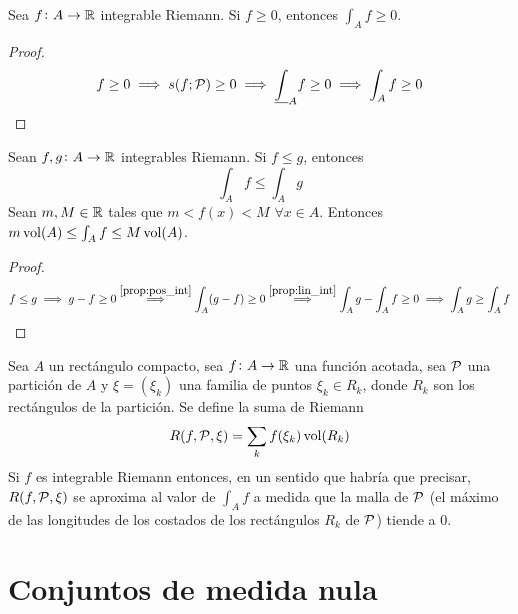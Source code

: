 \begin{prop}[Positividad]\label{prop:pos_int}
    Sea $f \colon A \to \mathbb{R}$ integrable Riemann. Si $f \geq 0$, entonces
    $\int_A f \geq 0$.
\end{prop}
\begin{proof}
    \[
        f \geq 0 \implies s(f;\mathcal{P}) \geq 0 \implies \underline{\int}_A f \geq 0
        \implies \int_A f \geq 0
    \]
\end{proof}

\begin{col}
    Sean $f,g \colon A \to \mathbb{R}$ integrables Riemann. Si $f \leq g$, entonces
    \[
        \int_A f \leq \int_A g
    \]
    Sean $m,M \in \mathbb{R}$ tales que $m < f(x) < M$ $\forall x \in A$. Entonces
    $m\operatorname{vol}(A) \leq \int_A f \leq M\operatorname{vol}(A)$.
\end{col}

\begin{proof}
    \[
        f \leq g \implies g - f \geq 0 \stackrel{\ref{prop:pos_int}}{\implies}
        \int_A (g-f) \geq 0 \stackrel{\ref{prop:lin_int}}{\implies} \int_A g -
        \int_A f \geq 0 \implies \int_A g \geq \int_A f
    \]
\end{proof}

\begin{prop}
    Sea $A$ un rectángulo compacto, sea $f \colon A \to \mathbb{R}$ una función acotada,
    sea $\mathcal{P}$ una partición de $A$ y $\xi = \left(\xi_k\right)$ una familia de
    puntos $\xi_k \in R_k$, donde $R_k$ son los rectángulos de la partición. Se
    define la suma de Riemann
    \[
        R(f,\mathcal{P},\xi) = \sum_k f(\xi_k)\operatorname{vol}(R_k)
    \]
    Si $f$ es integrable Riemann entonces, en un sentido que habría que precisar,
    $R(f,\mathcal{P},\xi)$ se aproxima al valor de $\int_A f$ a medida que la malla de
    $\mathcal{P}$ (el máximo de las longitudes de los costados de los rectángulos $R_k$ de
    $\mathcal{P}$) tiende a 0.
\end{prop}

\section{Conjuntos de medida nula}

